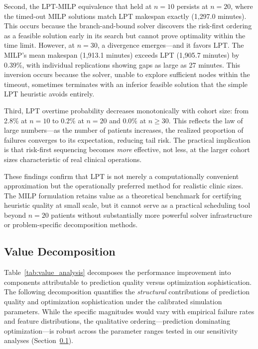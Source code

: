 \documentclass[11pt,a4paper]{article}
\begin{document}
Second, the LPT-MILP equivalence that held at $n = 10$ persists at $n = 20$, where the timed-out MILP solutions match LPT makespan exactly (1{,}297.0 minutes). This occurs because the branch-and-bound solver discovers the risk-first ordering as a feasible solution early in its search but cannot prove optimality within the time limit. However, at $n = 30$, a divergence emerges---and it favors LPT. The MILP's mean makespan (1{,}913.1 minutes) exceeds LPT (1{,}905.7 minutes) by 0.39\%, with individual replications showing gaps as large as 27 minutes. This inversion occurs because the solver, unable to explore sufficient nodes within the timeout, sometimes terminates with an inferior feasible solution that the simple LPT heuristic avoids entirely.

Third, LPT overtime probability decreases monotonically with cohort size: from 2.8\% at $n = 10$ to 0.2\% at $n = 20$ and 0.0\% at $n \geq 30$. This reflects the law of large numbers---as the number of patients increases, the realized proportion of failures converges to its expectation, reducing tail risk. The practical implication is that risk-first sequencing becomes \textit{more} effective, not less, at the larger cohort sizes characteristic of real clinical operations.

These findings confirm that LPT is not merely a computationally convenient approximation but the operationally preferred method for realistic clinic sizes. The MILP formulation retains value as a theoretical benchmark for certifying heuristic quality at small scale, but it cannot serve as a practical scheduling tool beyond $n = 20$ patients without substantially more powerful solver infrastructure or problem-specific decomposition methods.


\subsection{Value Decomposition}
\label{sec:value_analysis}

Table~\ref{tab:value_analysis} decomposes the performance improvement into components attributable to prediction quality versus optimization sophistication. The following decomposition quantifies the \textit{structural} contributions of prediction quality and optimization sophistication under the calibrated simulation parameters. While the specific magnitudes would vary with empirical failure rates and feature distributions, the qualitative ordering---prediction dominating optimization---is robust across the parameter ranges tested in our sensitivity analyses (Section~\ref{sec:value_analysis}).
\end{document}
